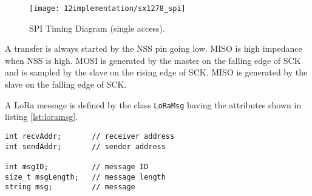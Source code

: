 \begin{figure}[H]
	\centering	
	\texttt{[image: 12implementation/sx1278\_spi]}
	\caption{SPI Timing Diagram (single access).}
	\label{fig:sx1278_spi}
\end{figure}

A transfer is always started by the NSS pin going low. MISO is high impedance when NSS is high. MOSI is generated by the master on the falling edge of SCK and is sampled by the slave on the rising edge of SCK. MISO is generated by the slave on the falling edge of SCK.

A LoRa message is defined by the class \verb|LoRaMsg| having the attributes shown in listing \ref{lst:loramsg}.

\begin{lstlisting}[caption={LoRa message}, label={lst:loramsg}]
int recvAddr;     	// receiver address
int sendAddr;     	// sender address

int msgID;        	// message ID
size_t msgLength; 	// message length
string msg;       	// message
\end{lstlisting}


